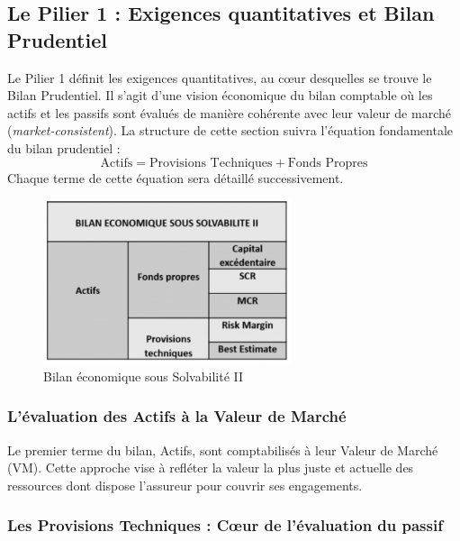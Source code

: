 \subsection{Le Pilier 1 : Exigences quantitatives et Bilan Prudentiel}

Le Pilier 1 définit les exigences quantitatives, au cœur desquelles se trouve le Bilan Prudentiel. Il s'agit d'une vision économique du bilan comptable où les actifs et les passifs sont évalués de manière cohérente avec leur valeur de marché (\textit{market-consistent}). La structure de cette section suivra l'équation fondamentale du bilan prudentiel :
\begin{equation}
    \text{Actifs} = \text{Provisions Techniques} + \text{Fonds Propres}
\end{equation}
Chaque terme de cette équation sera détaillé successivement.

\begin{figure}[H]
    \centering
    \includegraphics[width=0.65\textwidth]{images/2_chapitres/chapitre1/bilanS2.png}
    \caption{Bilan économique sous Solvabilité II}
    \label{fig:Bilan_economique_S2}
\end{figure}


\subsubsection{L'évaluation des Actifs à la Valeur de Marché}

Le premier terme du bilan, Actifs, sont comptabilisés à leur Valeur de Marché (VM). Cette approche vise à refléter la valeur la plus juste et actuelle des ressources dont dispose l'assureur pour couvrir ses engagements.


\subsubsection{Les Provisions Techniques : Cœur de l'évaluation du passif}


